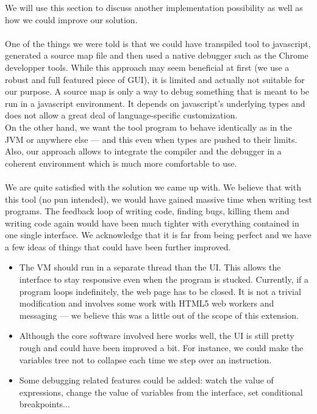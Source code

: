 We will use this section to discuss another implementation possibility as well as how we could improve our solution.

\paragraph{}
One of the things we were told is that we could have transpiled tool to javascript, generated a source map file and then used a native debugger such as the Chrome developper tools. While this approach may seem beneficial at first (we use a robust and full featured piece of GUI), it is limited and actually not suitable for our purpose. A source map is only a way to debug something that is meant to be run in a javascript environment. It depends on javascript's underlying types and does not allow a great deal of language-specific customization. \\On the other hand, we want the tool program to behave identically as in the JVM or anywhere else --- and this even when types are pushed to their limits. Also, our approach allows to integrate the compiler and the debugger in a coherent environment which is much more comfortable to use.

\paragraph{}
We are quite satisfied with the solution we came up with. We believe that with this tool (no pun intended), we would have gained massive time when writing test programs. The feedback loop of writing code, finding bugs, killing them and writing code again would have been much tighter with everything contained in one single interface. We acknowledge that it is far from being perfect and we have a few ideas of things that could have been further improved.

\begin{itemize}
\item The VM should run in a separate thread than the UI. This allows the interface to stay responsive even when the program is stucked. Currently, if a program loops indefinitely, the web page has to be closed. It is not a trivial modification and involves some work with HTML5 web workers and messaging --- we believe this was a little out of the scope of this extension.
\item Although the core software involved here works well, the UI is still pretty rough and could have been improved a bit. For instance, we could make the variables tree not to collapse each time we step over an instruction.
\item Some debugging related features could be added: watch the value of expressions, change the value of variables from the interface, set conditional breakpoints...
\end{itemize}